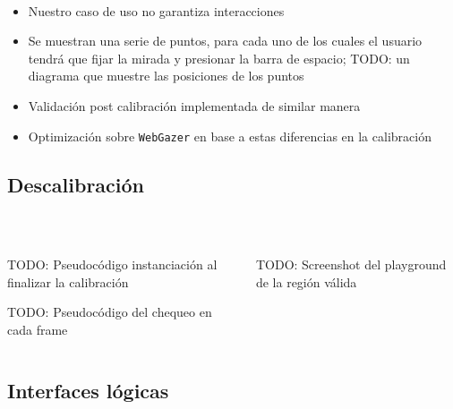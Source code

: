 \documentclass[aspectratio=169]{beamer}
\begin{document}
\begin{frame}{~}
  \begin{itemize}
    \item Nuestro caso de uso no garantiza interacciones

    \item Se muestran una serie de puntos, para cada uno de los cuales el
      usuario tendrá que fijar la mirada y presionar la barra de espacio; TODO:
      un diagrama que muestre las posiciones de los puntos
    
    \item Validación post calibración implementada de similar manera

    \item Optimización sobre \texttt{WebGazer} en base a estas diferencias en
      la calibración
  \end{itemize}
\end{frame}

\subsection{Descalibración}

\begin{frame}{~}

  \begin{columns}
    \begin{column}{.5\textwidth}
      TODO: Pseudocódigo instanciación al finalizar la calibración \par
      TODO: Pseudocódigo del chequeo en cada frame
    \end{column}

    \begin{column}{.5\textwidth}
      TODO: Screenshot del playground de la región válida
    \end{column}
  \end{columns}

\end{frame}

\subsection{Interfaces lógicas}
\end{document}
